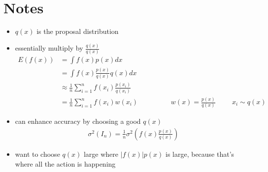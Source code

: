 \documentclass[10pt,a4paper]{article}
\begin{document}
\section{Notes}
\begin{itemize}
\item $q(x)$ is the proposal distribution
\item essentially multiply by $\frac{q(x)}{q(x)}$
\begin{align*}
E(f(x)) &= \int f(x)p(x)dx\\
		&= \int f(x)\frac{p(x)}{q(x)}q(x)dx\\
		&\approx \frac{1}{n} \sum_{i=1}^n f(x_i)\frac{p(x_i)}{q(x_i)}\\
		&= \frac{1}{n}\sum_{i=1}^n f(x_i)w(x_i)  \hspace{2cm}  w(x)=\frac{p(x)}{q(x)} \hspace{1cm} x_i \sim q(x)
\end{align*}
\item can enhance accuracy by choosing a good $q(x)$
\begin{align*}
\sigma^2(I_n) = \frac{1}{n} \sigma^2(f(x)\frac{p(x)}{q(x)})
\end{align*}
\item want to choose $q(x)$ large where $|f(x)| p(x)$ is large, because that's where all the action is happening
\end{itemize}
\end{document}
